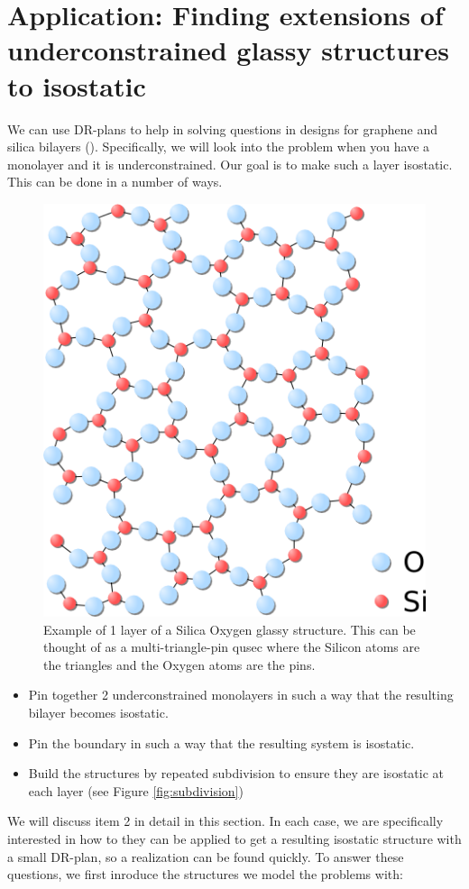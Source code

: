 \section{Application: Finding extensions of underconstrained glassy structures to isostatic}
\label{sec:bodypin}

We can use DR-plans to help in solving questions in designs for graphene and silica bilayers (). Specifically, we will look into the problem when you have a monolayer and it is underconstrained. Our goal is to make such a layer isostatic. This can be done in a number of ways.

\begin{figure}\centering
    \includegraphics[width=0.5\linewidth]{img/Silica}
    \caption{Example of 1 layer of a Silica Oxygen glassy structure. This can be thought of as a multi-triangle-pin qusec where the Silicon atoms are the triangles and the Oxygen atoms are the pins.}
    \label{fig:silica_glass}
\end{figure}

\begin{itemize}
    \item Pin together 2 underconstrained monolayers in such a way that the resulting bilayer becomes isostatic.
    \item Pin the boundary in such a way that the resulting system is isostatic.
    \item Build the structures by repeated subdivision to ensure they are isostatic at each layer (see Figure \ref{fig:subdivision})
\end{itemize}

We will discuss item 2 in detail in this section. In each case, we are specifically interested in how to they can be applied to get a resulting isostatic structure with a small DR-plan, so a realization can be found quickly. To answer these questions, we first inroduce the structures we model the problems with:

